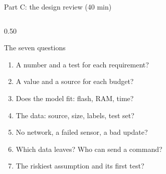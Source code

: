 \begin{frame}{Part C: the design review (40 min)}
  \begin{columns}[T]
    \begin{column}{0.50\textwidth}
      \begin{block}{The seven questions}
        \footnotesize
        \begin{enumerate}
          \item A number and a test for each requirement?
          \item A value and a source for each budget?
          \item Does the model fit: flash, RAM, time?
          \item The data: source, size, labels, test set?
          \item No network, a failed sensor, a bad update?
          \item Which data leaves? Who can send a command?
          \item The riskiest assumption and its first test?
        \end{enumerate}
      \end{block}
    \end{column}
  \end{columns}
\end{frame}

